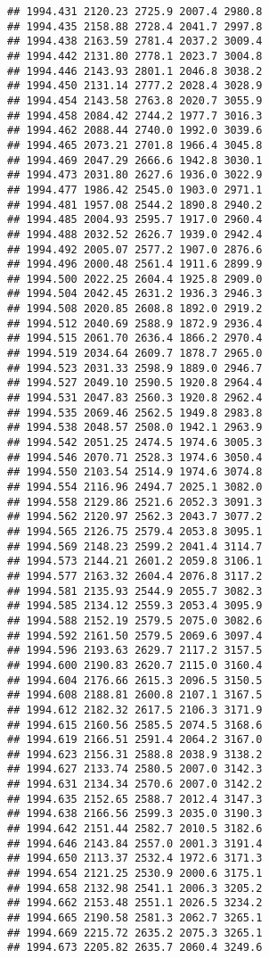 \documentclass[
]{article}
\begin{document}
\begin{verbatim}
## 1994.431 2120.23 2725.9 2007.4 2980.8
## 1994.435 2158.88 2728.4 2041.7 2997.8
## 1994.438 2163.59 2781.4 2037.2 3009.4
## 1994.442 2131.80 2778.1 2023.7 3004.8
## 1994.446 2143.93 2801.1 2046.8 3038.2
## 1994.450 2131.14 2777.2 2028.4 3028.9
## 1994.454 2143.58 2763.8 2020.7 3055.9
## 1994.458 2084.42 2744.2 1977.7 3016.3
## 1994.462 2088.44 2740.0 1992.0 3039.6
## 1994.465 2073.21 2701.8 1966.4 3045.8
## 1994.469 2047.29 2666.6 1942.8 3030.1
## 1994.473 2031.80 2627.6 1936.0 3022.9
## 1994.477 1986.42 2545.0 1903.0 2971.1
## 1994.481 1957.08 2544.2 1890.8 2940.2
## 1994.485 2004.93 2595.7 1917.0 2960.4
## 1994.488 2032.52 2626.7 1939.0 2942.4
## 1994.492 2005.07 2577.2 1907.0 2876.6
## 1994.496 2000.48 2561.4 1911.6 2899.9
## 1994.500 2022.25 2604.4 1925.8 2909.0
## 1994.504 2042.45 2631.2 1936.3 2946.3
## 1994.508 2020.85 2608.8 1892.0 2919.2
## 1994.512 2040.69 2588.9 1872.9 2936.4
## 1994.515 2061.70 2636.4 1866.2 2970.4
## 1994.519 2034.64 2609.7 1878.7 2965.0
## 1994.523 2031.33 2598.9 1889.0 2946.7
## 1994.527 2049.10 2590.5 1920.8 2964.4
## 1994.531 2047.83 2560.3 1920.8 2962.4
## 1994.535 2069.46 2562.5 1949.8 2983.8
## 1994.538 2048.57 2508.0 1942.1 2963.9
## 1994.542 2051.25 2474.5 1974.6 3005.3
## 1994.546 2070.71 2528.3 1974.6 3050.4
## 1994.550 2103.54 2514.9 1974.6 3074.8
## 1994.554 2116.96 2494.7 2025.1 3082.0
## 1994.558 2129.86 2521.6 2052.3 3091.3
## 1994.562 2120.97 2562.3 2043.7 3077.2
## 1994.565 2126.75 2579.4 2053.8 3095.1
## 1994.569 2148.23 2599.2 2041.4 3114.7
## 1994.573 2144.21 2601.2 2059.8 3106.1
## 1994.577 2163.32 2604.4 2076.8 3117.2
## 1994.581 2135.93 2544.9 2055.7 3082.3
## 1994.585 2134.12 2559.3 2053.4 3095.9
## 1994.588 2152.19 2579.5 2075.0 3082.6
## 1994.592 2161.50 2579.5 2069.6 3097.4
## 1994.596 2193.63 2629.7 2117.2 3157.5
## 1994.600 2190.83 2620.7 2115.0 3160.4
## 1994.604 2176.66 2615.3 2096.5 3150.5
## 1994.608 2188.81 2600.8 2107.1 3167.5
## 1994.612 2182.32 2617.5 2106.3 3171.9
## 1994.615 2160.56 2585.5 2074.5 3168.6
## 1994.619 2166.51 2591.4 2064.2 3167.0
## 1994.623 2156.31 2588.8 2038.9 3138.2
## 1994.627 2133.74 2580.5 2007.0 3142.3
## 1994.631 2134.34 2570.6 2007.0 3142.2
## 1994.635 2152.65 2588.7 2012.4 3147.3
## 1994.638 2166.56 2599.3 2035.0 3190.3
## 1994.642 2151.44 2582.7 2010.5 3182.6
## 1994.646 2143.84 2557.0 2001.3 3191.4
## 1994.650 2113.37 2532.4 1972.6 3171.3
## 1994.654 2121.25 2530.9 2000.6 3175.1
## 1994.658 2132.98 2541.1 2006.3 3205.2
## 1994.662 2153.48 2551.1 2026.5 3234.2
## 1994.665 2190.58 2581.3 2062.7 3265.1
## 1994.669 2215.72 2635.2 2075.3 3265.1
## 1994.673 2205.82 2635.7 2060.4 3249.6

\end{verbatim}
\end{document}
